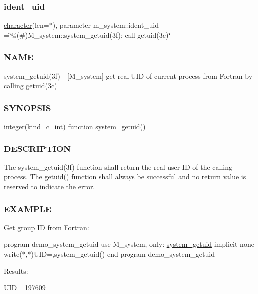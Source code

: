 \subsubsection{\texorpdfstring{ident\+\_\+uid}{ident\_uid}}
{\footnotesize\ttfamily \hyperlink{option__stopwatch_83_8txt_abd4b21fbbd175834027b5224bfe97e66}{character}(len=$\ast$), parameter m\+\_\+system\+::ident\+\_\+uid =\char`\"{}@(\#)M\+\_\+system\+::system\+\_\+getuid(3f)\+: call getuid(3c)\char`\"{}\hspace{0.3cm}{\ttfamily [private]}}



\subsubsection*{N\+A\+ME}

system\+\_\+getuid(3f) -\/ \mbox{[}M\+\_\+system\mbox{]} get real U\+ID of current process from Fortran by calling getuid(3c) \subsubsection*{S\+Y\+N\+O\+P\+S\+IS}

integer(kind=c\+\_\+int) function system\+\_\+getuid()

\subsubsection*{D\+E\+S\+C\+R\+I\+P\+T\+I\+ON}

The system\+\_\+getuid(3f) function shall return the real user ID of the calling process. The getuid() function shall always be successful and no return value is reserved to indicate the error. \subsubsection*{E\+X\+A\+M\+P\+LE}

Get group ID from Fortran\+:

program demo\+\_\+system\+\_\+getuid use M\+\_\+system, only\+: \hyperlink{interfacem__system_1_1system__getuid}{system\+\_\+getuid} implicit none write($\ast$,$\ast$)\textquotesingle{}U\+ID=\textquotesingle{},system\+\_\+getuid() end program demo\+\_\+system\+\_\+getuid

Results\+:

U\+ID= 197609 \mbox{\label{namespacem__system_a75073212be18a8ed970e7a919cf0c75f}} 
